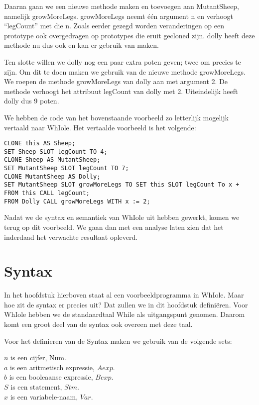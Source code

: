 \documentclass[12pt]{article}
\begin{document}
Daarna gaan we een nieuwe methode maken en toevoegen aan MutantSheep, namelijk growMoreLegs.
growMoreLegs neemt \'e\'en argument n en verhoogt ``legCount'' met die n. 
Zoals eerder gezegd worden veranderingen op een prototype ook overgedragen op prototypes die eruit gecloned zijn. dolly heeft deze methode nu dus ook en kan er gebruik van maken.\newline

Ten slotte willen we dolly nog een paar extra poten geven; twee om precies te zijn.
Om dit te doen maken we gebruik van de nieuwe methode growMoreLegs.
We roepen de methode growMoreLegs van dolly aan met argument 2.
De methode verhoogt het attribuut legCount van dolly met 2.
Uiteindelijk heeft dolly dus 9 poten.

We hebben de code van het bovenstaande voorbeeld zo letterlijk mogelijk vertaald naar WhIole.
Het vertaalde voorbeeld is het volgende:
\begin{lstlisting}[frame=single]
CLONE this AS Sheep;
SET Sheep SLOT legCount TO 4;
CLONE Sheep AS MutantSheep;
SET MutantSheep SLOT legCount TO 7;
CLONE MutantSheep AS Dolly;
SET MutantSheep SLOT growMoreLegs TO SET this SLOT legCount To x + FROM this CALL legCount;
FROM Dolly CALL growMoreLegs WITH x := 2;
\end{lstlisting}
Nadat we de syntax en semantiek van WhIole uit hebben gewerkt, komen we terug op dit voorbeeld.
We gaan dan met een analyse laten zien dat het inderdaad het verwachte resultaat opleverd.

\pagebreak
\section{Syntax}
In het hoofdstuk hierboven staat al een voorbeeldprogramma in WhIole. Maar hoe zit de syntax er precies uit? Dat zullen we in dit hoofdstuk definiëren. Voor WhIole hebben we de standaardtaal While als uitgangspunt genomen. Daarom komt een groot deel van de syntax ook overeen met deze taal.

Voor het definieren van de Syntax maken we gebruik van de volgende sets:

$n$ is een cijfer, Num. \\
$a$ is een aritmetisch expressie, $Aexp$. \\
$b$ is een booleaanse expressie, $Bexp$. \\
$S$ is een statement, $Stm$. \\
$x$ is een variabele-naam, $Var$. \\
\end{document}
